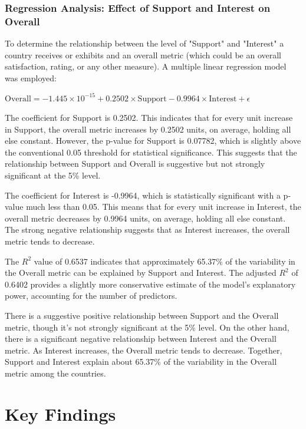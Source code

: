 \documentclass[12pt]{article}
\begin{document}
\subsubsection{Regression Analysis: Effect of Support and Interest on Overall}
\label{sss.supintvsoverall}

To determine the relationship between the level of "Support" and "Interest" a country receives or exhibits and an overall metric (which could be an overall satisfaction, rating, or any other measure).
A multiple linear regression model was employed:

$\text{Overall} = -1.445 \times 10^{-15} + 0.2502 \times \text{Support} - 0.9964 \times \text{Interest} + \epsilon$


The coefficient for Support is 0.2502. This indicates that for every unit increase in Support, the overall metric increases by 0.2502 units, on average, holding all else constant. However, the p-value for Support is 0.07782, which is slightly above the conventional 0.05 threshold for statistical significance. This suggests that the relationship between Support and Overall is suggestive but not strongly significant at the 5\% level.


The coefficient for Interest is -0.9964, which is statistically significant with a p-value much less than 0.05. This means that for every unit increase in Interest, the overall metric decreases by 0.9964 units, on average, holding all else constant. The strong negative relationship suggests that as Interest increases, the overall metric tends to decrease.

The $R^2$  value of 0.6537 indicates that approximately 65.37\% of the variability in the Overall metric can be explained by Support and Interest. The adjusted 
$R^2$ of 0.6402 provides a slightly more conservative estimate of the model's explanatory power, accounting for the number of predictors.

There is a suggestive positive relationship between Support and the Overall metric, though it's not strongly significant at the 5\% level. On the other hand, there is a significant negative relationship between Interest and the Overall metric. As Interest increases, the Overall metric tends to decrease. Together, Support and Interest explain about 65.37\% of the variability in the Overall metric among the countries.

\section{Key Findings}
\end{document}
